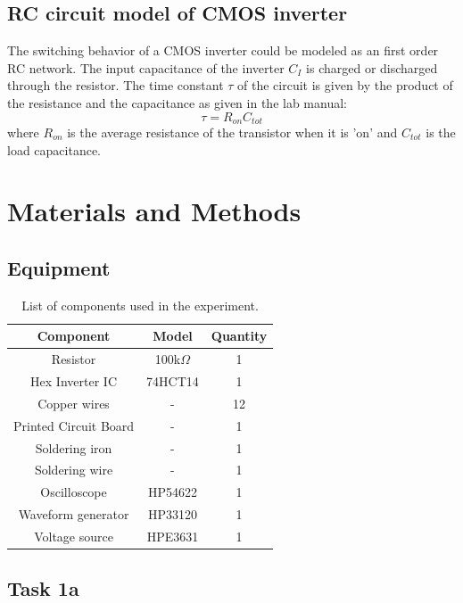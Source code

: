 \documentclass[onecolumn]{article}
\begin{document}
\subsection{RC circuit model of CMOS inverter}
The switching behavior of a CMOS inverter could be modeled as an first order RC network. The input capacitance of the inverter $C_I$ is charged or discharged through the resistor. The time constant $\tau$ of the circuit is given by the product of the resistance and the capacitance as given in the lab manual:
\begin{equation}\label{eq:tau} \tau = R_{on}C_{tot}\end{equation}
 where $R_{on}$ is the average resistance of the transistor when it is 'on' and $C_{tot}$ is the load capacitance.

\newpage

\section{Materials and Methods}
\subsection{Equipment}
\begin{table}[h!]
    \centering
    \begin{tabular}{|c|c|c|}
        \hline
        \textbf{Component} & \textbf{Model} & \textbf{Quantity} \\
        \hline
        Resistor & 100k$\Omega$ & 1 \\
        Hex Inverter IC & 74HCT14 & 1 \\
        Copper wires & - & 12 \\
        Printed Circuit Board & - & 1 \\
        Soldering iron & - & 1 \\
        Soldering wire & - & 1 \\
        Oscilloscope & HP54622 & 1 \\
        Waveform generator  & HP33120 & 1 \\
        Voltage source & HPE3631 & 1 \\ 
        \hline
    \end{tabular}
    \caption{List of components used in the experiment.}
    \label{tab:bom}
\end{table}

\subsection{Task 1a}
\end{document}
